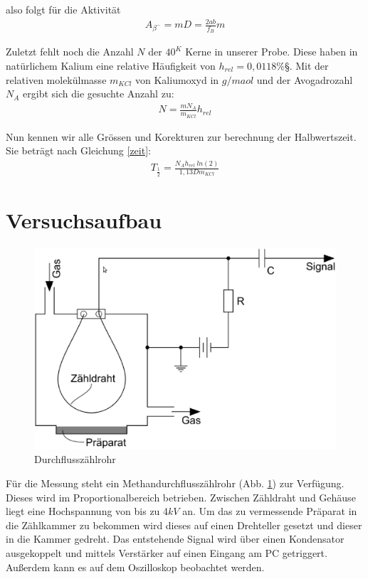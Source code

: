 \documentclass[12pt]{article}
\begin{document}
also folgt für die Aktivität
\begin{align}
 A_{\beta^-}=m D=\frac{2ab}{f_B}m
\end{align}

Zuletzt fehlt noch die Anzahl $N$ der ${40}^K$ Kerne in unserer Probe. Diese haben in natürlichem Kalium eine relative Häufigkeit von $h_{rel}=0,0118\%$§. Mit der relativen molekülmasse $m_{KCl}$ von Kaliumoxyd in $g/maol$ und der Avogadrozahl $N_A$ ergibt sich die gesuchte Anzahl zu:
\begin{align}
 N=\frac{m N_A}{m_{KCl}} h_{rel}
\end{align}

Nun kennen wir alle Grössen und Korekturen zur berechnung der Halbwertszeit. Sie beträgt nach Gleichung \ref{zeit}:
\begin{align}
 T_{\frac{1}{2}} = \frac{N_A h_{rel} ~ ln(2)}{1,13 D m_{KCl}}
\end{align}

\section{Versuchsaufbau}

\begin{figure}[H]  
\centering
\includegraphics[width=0.9\linewidth]{pictures/aufbau.eps}
\caption{Durchflusszählrohr}
\label{aufbau}
\end{figure}

Für die Messung steht ein Methandurchflusszählrohr (Abb. \ref{aufbau}) zur Verfügung.
Dieses wird im Proportionalbereich betrieben. Zwischen Zähldraht und Gehäuse liegt eine Hochspannung von bis zu 4$kV$ an.
Um das zu vermessende Präparat in die Zählkammer zu bekommen wird dieses auf einen Drehteller gesetzt und dieser in die Kammer gedreht.
Das entstehende Signal wird über einen Kondensator ausgekoppelt und mittels Verstärker auf einen Eingang am PC getriggert. Außerdem kann
es auf dem Oszilloskop beobachtet werden.
\end{document}
